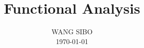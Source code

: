 

\setcounter{chapter}{-1}



\frontmatter

\makeatletter

\makeatother

\title{Functional Analysis}
\author{WANG SIBO\\ \today}

\maketitle

\tableofcontents

\mainmatter








